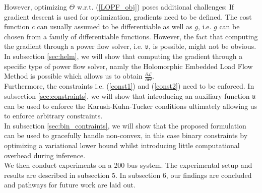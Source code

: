 However, optimizing $\Theta$ w.r.t. (\ref{LOPF_obj}) poses additional challenges: If gradient descent is used for optimization, gradients need to be defined. The cost function $c$ can usually assumed to be differentiable as well as $g$, i.e. $g$ can be chosen from a family of differentiable functions. However, the fact that computing the gradient through a power flow solver, i.e. $\mathfrak{v}$, is possible, might not be obvious. In subsection \ref{sec:helm}, we will show that computing the gradient through a specific type of power flow solver, namly the Holomorphic Embedded Load Flow Method is possible which allows us to obtain $\frac{\partial \mathcal{L}}{\partial \Theta}$.\\
Furthermore, the constraints i.e. (\ref{const1}) and (\ref{const2}) need to be enforced. In subsection \ref{sec:constraints}, we will show that introducing an auxiliary function $\mathfrak{u}$ can be used to enforce the Karush-Kuhn-Tucker conditions ultimately allowing us to enforce arbitrary constraints.\\
In subsection \ref{sec:bin_contraints}, we will show that the proposed formulation can be used to gracefully handle non-convex, in this case binary constraints by optimizing a variational lower bound whilst introducing little computational overhead during inference.\\
We then conduct experiments on a 200 bus system. The experimental setup and results are described in subsection 5. In subsection 6, our findings are concluded and pathways for future work are laid out.


